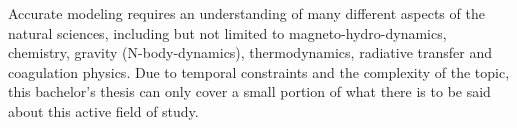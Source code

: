     Accurate modeling requires an understanding of many different 
    aspects of the natural sciences, including but not limited to 
    magneto-hydro-dynamics, chemistry, gravity (N-body-dynamics), 
    thermodynamics, radiative transfer and coagulation physics. Due to temporal 
    constraints and the complexity of the topic, this bachelor's thesis can 
    only cover a small portion of what there is to be said about this 
    active field of study.
  


